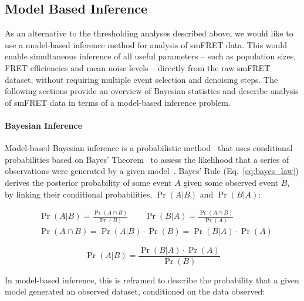 
\subsection{Model Based Inference}
\label{sect:model_based_inference}
As an alternative to the thresholding analyses described above, we would like to use a model-based inference method for analysis of smFRET data. This would enable simultaneous inference of all useful parameters -- such as population sizes, FRET efficiencies and mean noise levels -- directly from the raw smFRET dataset, without requiring multiple event selection and denoising steps. The following sections provide an overview of Bayesian statistics and describe analysis of smFRET data in terms of a model-based inference problem. 

\paragraph{Bayesian Inference}
Model-based Bayesian inference is a probabilistic method~\cite{barber12} that uses conditional probabilities based on Bayes' Theorem~\cite{bayes63} to assess the likelihood that a series of observations were generated by a given model~\cite{mackay03}. Bayes' Rule (Eq.~\ref{eq:bayes_law}) derives the posterior probability of some event $A$ given some observed event $B$,  by linking their conditional probabilities, $\Pr(A|B)$ and $\Pr(B|A)$: 

\begin{equation}
\begin{aligned}
& \Pr(A|B) = \frac{\Pr(A \cap B)}{\Pr(B)} \qquad \Pr(B|A) = \frac{\Pr(A \cap B)}{\Pr(A)} \\
& \Pr(A \cap B) = \Pr(A|B) \cdot \Pr(B) = \Pr(B|A) \cdot \Pr(A)
\end{aligned}
\label{eq:conditional}
\end{equation} 

\begin{equation}
\Pr(A|B) = \frac{\Pr(B|A) \cdot \Pr(A)}{\Pr(B)} 
\label{eq:bayes_law}
\end{equation}

In model-based inference, this is reframed to describe the probability that a given model generated an observed dataset, conditioned on the data observed:


